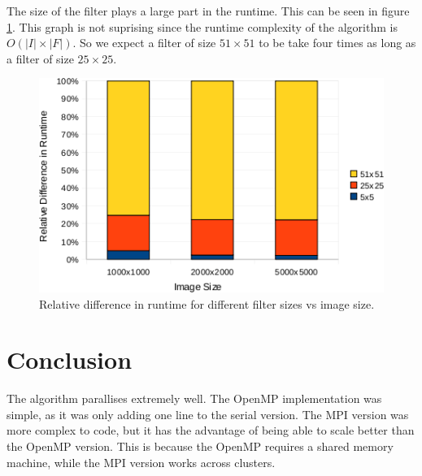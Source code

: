 \documentclass{article}
\begin{document}
The size of the filter plays a large part in the runtime. This can be seen in
figure \ref{fig:filter}. This graph is not suprising since the runtime
complexity of the algorithm is $O(|I| \times |F|)$. So we expect a filter of
size $51 \times 51$ to be take four times as long as a filter of size $25
\times 25$.

\begin{figure}[h]
  \centering
  \includegraphics{images/filter}
  \caption{Relative difference in runtime for different filter sizes vs image size.}
  \label{fig:filter}
\end{figure}

\section{Conclusion}

The algorithm parallises extremely well. The OpenMP implementation was simple,
as it was only adding one line to the serial version. The MPI version was more
complex to code, but it has the advantage of being able to scale better than
the OpenMP version. This is because the OpenMP requires a shared memory
machine, while the MPI version works across clusters.
\end{document}
